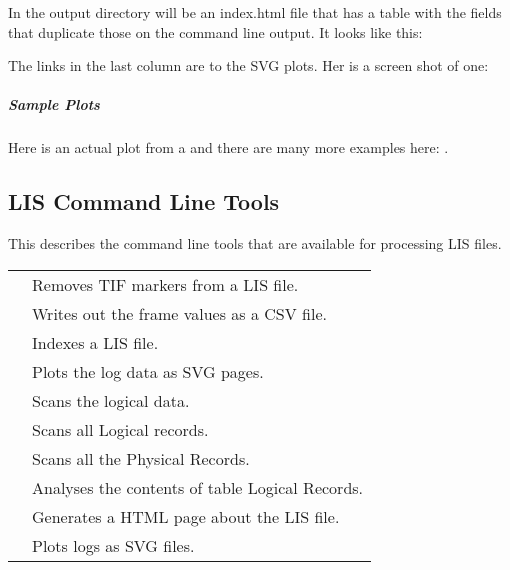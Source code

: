 \documentclass[letterpaper,10pt,english]{sphinxmanual}
\begin{document}
In the output directory will be an index.html file that has a table with the fields that duplicate those on the command line output. It looks like this:

\noindent{}

The links in the last column are to the SVG plots. Her is a screen shot of one:

\noindent{}


\subparagraph{Sample Plots}
\label{\detokenize{cmd_line_tools/TD_cmd_line_tools:sample-plots}}
Here is an actual plot from a  and there are many more examples here: {\hyperref[\detokenize{examples/examples:totaldepth-examples-plots}]{}}.


\subsection{LIS Command Line Tools}
\label{\detokenize{cmd_line_tools/LIS_cmd_line_tools:lis-command-line-tools}}\label{\detokenize{cmd_line_tools/LIS_cmd_line_tools::doc}}
This describes the command line tools that are available for processing LIS files.


\begin{savenotes}\sphinxattablestart
\centering
\begin{tabulary}{\linewidth}[t]{|T|T|}
\hline
{}\relax &\relax \\
\hline
{}
&
Removes TIF markers from a LIS file.
\\
\hline
{}
&
Writes out the frame values as a CSV file.
\\
\hline
{}
&
Indexes a LIS file.
\\
\hline
{}
&
Plots the log data as SVG pages.
\\
\hline
{}
&
Scans the logical data.
\\
\hline
{}
&
Scans all Logical records.
\\
\hline
{}
&
Scans all the Physical Records.
\\
\hline
{}
&
Analyses the contents of table Logical Records.
\\
\hline
{}
&
Generates a HTML page about the LIS file.
\\
\hline
{}
&
Plots logs as SVG files.
\\
\hline
\end{tabulary}
\par
\sphinxattableend\end{savenotes}
\end{document}
